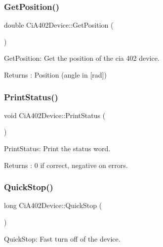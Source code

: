 \subsubsection{\texorpdfstring{Get\+Position()}{GetPosition()}}
{\footnotesize\ttfamily double Ci\+A402\+Device\+::\+Get\+Position (\begin{DoxyParamCaption}{ }\end{DoxyParamCaption})}



Get\+Position\+: Get the position of the cia 402 device. 

\begin{DoxyReturn}{Returns}
\+: Position (angle in \mbox{[}rad\mbox{]}) 
\end{DoxyReturn}
\mbox{\label{classCiA402Device_a9d5d8df28085395a3ab711107a181ebc}} 
\subsubsection{\texorpdfstring{Print\+Status()}{PrintStatus()}}
{\footnotesize\ttfamily void Ci\+A402\+Device\+::\+Print\+Status (\begin{DoxyParamCaption}{ }\end{DoxyParamCaption})}



Print\+Status\+: Print the status word. 

\begin{DoxyReturn}{Returns}
\+: 0 if correct, negative on errors. 
\end{DoxyReturn}
\mbox{\label{classCiA402Device_a8573afbf420c29aa86cd215d74f4e4e3}} 
\subsubsection{\texorpdfstring{Quick\+Stop()}{QuickStop()}}
{\footnotesize\ttfamily long Ci\+A402\+Device\+::\+Quick\+Stop (\begin{DoxyParamCaption}{ }\end{DoxyParamCaption})}



Quick\+Stop\+: Fast turn off of the device. 


